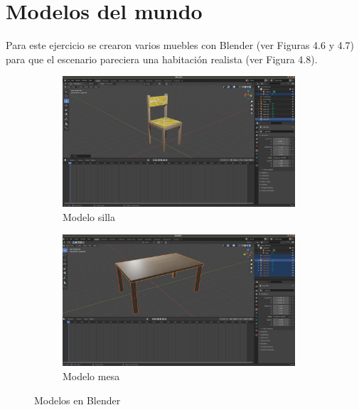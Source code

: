 \section{Modelos del mundo}
Para este ejercicio se crearon varios muebles con Blender (ver Figuras 4.6 y 4.7) para que el escenario pareciera una habitación realista (ver Figura 4.8).
\begin{figure}[H]
  \begin{subfigure}[b]{0.5\textwidth}
  \centering
    \includegraphics[width=0.95\textwidth, height=0.6\textwidth]{chapters/images/silla.png}
    \caption{Modelo silla}
    \label{fig:f1}
  \end{subfigure}
  \hfill
  \begin{subfigure}[b]{0.5\textwidth}
  \centering
    \includegraphics[width=0.95\textwidth, height=0.6\textwidth]{chapters/images/mesa.png}
	\caption{Modelo mesa}    
    \label{fig:f2}
 
  \end{subfigure}
  \caption{Modelos en Blender}
\end{figure}

